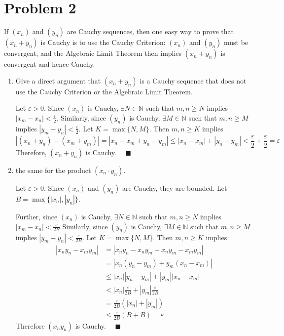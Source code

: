 \documentclass[12pt]{article}
\newcommand{\N}{\mathbb{N}}
\newcommand{\qed}{\quad \blacksquare}
\newcommand{\abs}[1]{\left\vert #1 \right\vert}
\newcommand{\ep}{\varepsilon}
\begin{document}
\section*{Problem 2}
If $(x_n)$ and $(y_n)$ are Cauchy sequences, then one easy way to prove that $(x_n + y_n)$ is Cauchy is to use the Cauchy Criterion: $(x_n)$ and $(y_n)$ must be convergent, and the Algebraic Limit Theorem then implies $(x_n + y_n)$ is convergent and hence Cauchy.
\begin{enumerate}
    \item Give a direct argument that $(x_n + y_n)$ is a Cauchy sequence that does not use the Cauchy Criterion or the Algebraic Limit Theorem.
    
        \color{blue}
            Let $\ep > 0$. Since $(x_n)$ is Cauchy, $\exists N \in \N$ such that $m,n \geq N$ implies $\abs{x_m - x_n} < \frac{\ep}{2}$. Similarly, since $(y_n)$ is Cauchy, $\exists M \in \N$ such that $m,n \geq M$ implies $\abs{y_m - y_n} < \frac{\ep}{2}$. Let $K = \max\{N,M\}$. Then $m,n \geq K$ implies    
            \[\abs{(x_n + y_n) - (x_m + y_m)} = \abs{x_n - x_m + y_n - y_m} \leq \abs{x_n - x_m} + \abs{y_n - y_m} < \frac{\ep}{2} + \frac{\ep}{2} = \ep\] 
            Therefore, $(x_n + y_n)$ is Cauchy. $\qed$
        \color{black}

    \item the same for the product $(x_n \cdot y_n)$.

        \color{blue}
            Let $\ep > 0$. Since $(x_n)$ and $(y_n)$ are Cauchy, they are bounded. Let $B = \max\{\abs{x_n}, \abs{y_n}\}$. 
            
            Further, since $(x_n)$ is Cauchy, $\exists N \in \N$ such that $m,n \geq N$ implies $\abs{x_m - x_n} < \frac{\ep}{2B}$ Similarly, since $(y_n)$ is Cauchy, $\exists M \in \N$ such that $m,n \geq M$ implies $\abs{y_m - y_n} < \frac{\ep}{2B}$. Let $K = \max\{N,M\}$. Then $m,n \geq K$ implies    
            \begin{align*}
                \abs{x_ny_n - x_my_m} &= \abs{x_ny_n - x_ny_m + x_ny_m - x_my_m} \\
                &= \abs{x_n(y_n - y_m) + y_m(x_n - x_m)} \\
                &\leq \abs{x_n}\abs{y_n - y_m} + \abs{y_m}\abs{x_n - x_m}\\
                &< \abs{x_n}\frac{\ep}{2B} + \abs{y_m}\frac{\ep}{2B} \\
                &= \frac{\ep}{2B}(\abs{x_n} + \abs{y_m})\\ 
                &\leq \frac{\ep}{2B}(B + B) = \ep
            \end{align*}
            Therefore $(x_ny_n)$ is Cauchy. $\qed$
        \color{black}

\end{enumerate}
\end{document}

